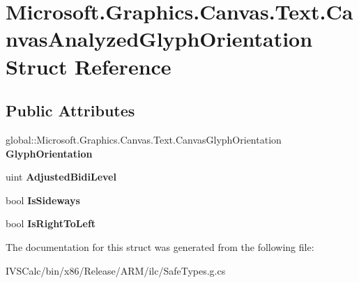\hypertarget{struct_microsoft_1_1_graphics_1_1_canvas_1_1_text_1_1_canvas_analyzed_glyph_orientation}{}\section{Microsoft.\+Graphics.\+Canvas.\+Text.\+Canvas\+Analyzed\+Glyph\+Orientation Struct Reference}
\label{struct_microsoft_1_1_graphics_1_1_canvas_1_1_text_1_1_canvas_analyzed_glyph_orientation}
\subsection*{Public Attributes}
\begin{DoxyCompactItemize}
\item 
\mbox{\label{struct_microsoft_1_1_graphics_1_1_canvas_1_1_text_1_1_canvas_analyzed_glyph_orientation_a72d96595e39a281b36a8b4a01f43492e}} 
global\+::\+Microsoft.\+Graphics.\+Canvas.\+Text.\+Canvas\+Glyph\+Orientation {\bfseries Glyph\+Orientation}
\item 
\mbox{\label{struct_microsoft_1_1_graphics_1_1_canvas_1_1_text_1_1_canvas_analyzed_glyph_orientation_ab39070946e1c19380154156bad3f1a45}} 
uint {\bfseries Adjusted\+Bidi\+Level}
\item 
\mbox{\label{struct_microsoft_1_1_graphics_1_1_canvas_1_1_text_1_1_canvas_analyzed_glyph_orientation_a83a8560db83210082fd7a9c410285b73}} 
bool {\bfseries Is\+Sideways}
\item 
\mbox{\label{struct_microsoft_1_1_graphics_1_1_canvas_1_1_text_1_1_canvas_analyzed_glyph_orientation_a28f5d95aa8702198119e604ffd835426}} 
bool {\bfseries Is\+Right\+To\+Left}
\end{DoxyCompactItemize}


The documentation for this struct was generated from the following file\+:\begin{DoxyCompactItemize}
\item 
I\+V\+S\+Calc/bin/x86/\+Release/\+A\+R\+M/ilc/Safe\+Types.\+g.\+cs\end{DoxyCompactItemize}

